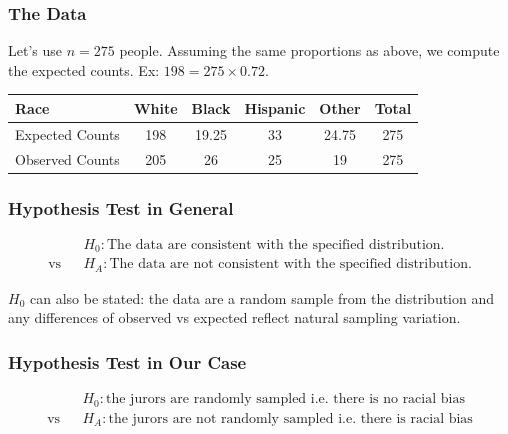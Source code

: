 \documentclass[handout]{beamer}
\newcommand{\blue}[1]{\textcolor{blue2}{#1}}
\begin{document}
\begin{frame}[fragile]
\frametitle{The Data}

Let's use $n=275$ people.  Assuming the same proportions as above,  we compute the \blue{expected} counts.  Ex: $198 = 275 \times 0.72$. 

\begin{center}
\begin{tabular}{l||cccc|c}
Race & White & Black & Hispanic & Other & Total \\ 
\hline
Expected Counts & 198 & 19.25 & 33 & 24.75 & 275\\ 
Observed Counts & 205 & 26 & 25 & 19 & 275\\ 
\end{tabular}
\end{center}

\end{frame}


\begin{frame}[fragile]
\frametitle{Hypothesis Test in General}
%
%
\begin{eqnarray*}
&&H_0:\mbox{The data are consistent with the specified distribution.}\\
\mbox{vs} &&H_A:\mbox{The data are not consistent with the specified distribution.}
\end{eqnarray*}

\pause $H_0$ can also be stated: the data are a random sample from the distribution and any differences of observed vs expected reflect natural sampling variation.  

\end{frame}


\begin{frame}[fragile]
\frametitle{Hypothesis Test in Our Case}
%
%
\begin{eqnarray*}
&& H_0:\mbox{the jurors are randomly sampled i.e. there is no racial bias}\\
\mbox{vs}&& H_A:\mbox{the jurors are not randomly sampled i.e. there is racial bias}
\end{eqnarray*}

\end{frame}
\end{document}
